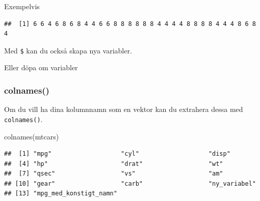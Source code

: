 \documentclass[
]{book}
\newenvironment{Shaded}{\begin{snugshade}}{\end{snugshade}}
\newcommand{\FunctionTok}[1]{\textcolor[rgb]{0.00,0.00,0.00}{#1}}
\newcommand{\NormalTok}[1]{#1}
\newcommand{\OtherTok}[1]{\textcolor[rgb]{0.56,0.35,0.01}{#1}}
\newcommand{\SpecialCharTok}[1]{\textcolor[rgb]{0.00,0.00,0.00}{#1}}
\begin{document}
Exempelvis

\begin{Shaded}
\end{Shaded}

\begin{verbatim}
##  [1] 6 6 4 6 8 6 8 4 4 6 6 8 8 8 8 8 8 4 4 4 4 8 8 8 8 4 4 4 8 6 8 4
\end{verbatim}

Med \texttt{\$} kan du också skapa nya variabler.

\begin{Shaded}
\end{Shaded}

Eller döpa om variabler

\begin{Shaded}
\end{Shaded}

\hypertarget{colnames}{%
\subsubsection{colnames()}\label{colnames}}

Om du vill ha dina kolumnnamn som en vektor kan du extrahera dessa med \texttt{colnames()}.

\begin{Shaded}
\begin{Highlighting}[]
\FunctionTok{colnames}\NormalTok{(mtcars)}
\end{Highlighting}
\end{Shaded}

\begin{verbatim}
##  [1] "mpg"                   "cyl"                   "disp"                 
##  [4] "hp"                    "drat"                  "wt"                   
##  [7] "qsec"                  "vs"                    "am"                   
## [10] "gear"                  "carb"                  "ny_variabel"          
## [13] "mpg_med_konstigt_namn"
\end{verbatim}
\end{document}
